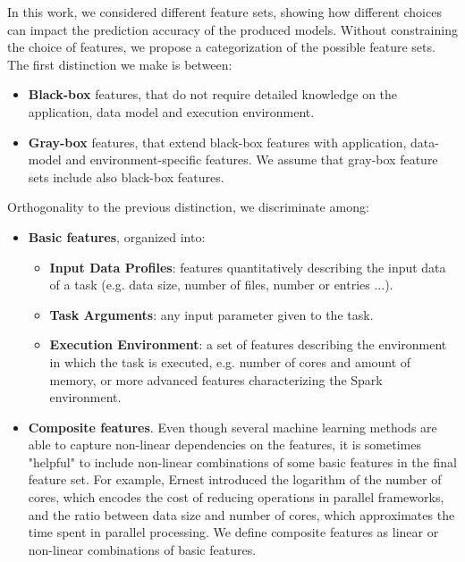 \documentclass[a4paper, 10pt, conference]{ieeeconf}      %
\begin{document}
In this work, we considered different feature sets, showing how different choices can impact the prediction accuracy of the produced models. Without constraining the choice of features, we propose a categorization of the possible feature sets. The first distinction we make is between: 
\begin{itemize}
    \item \textbf{Black-box} features, that do not require detailed knowledge on the application, data model and execution environment.
    \item \textbf{Gray-box} features, that extend black-box features with application, data-model  and environment-specific features. We assume that gray-box feature sets include also black-box features.
\end{itemize}
Orthogonality to the previous distinction, we discriminate among:
\begin{itemize}
    \item \textbf{Basic features}, organized into:
    \begin{itemize}
        \item \textbf{Input Data Profiles}: features quantitatively describing the input data of a task (e.g. data size, number of files, number or entries ...).
        \item \textbf{Task Arguments}: any input parameter given to the task.
        \item \textbf{Execution Environment}: a set of features describing the environment in which the task is executed, e.g. number of cores and amount of memory, or more advanced features characterizing the Spark environment.
    \end{itemize}
    \item \textbf{Composite features}. Even though several machine learning methods are able to capture non-linear dependencies on the features, it is sometimes "helpful" to include non-linear combinations of some basic features in the final feature set. For example, Ernest \cite{ernest} 
    introduced the logarithm of the number of cores, which encodes the cost of reducing operations in parallel frameworks, and the ratio between data size and number of cores, which approximates the time spent in parallel processing. 
    We define composite features as linear or non-linear combinations of basic features.
\end{itemize}
\end{document}
